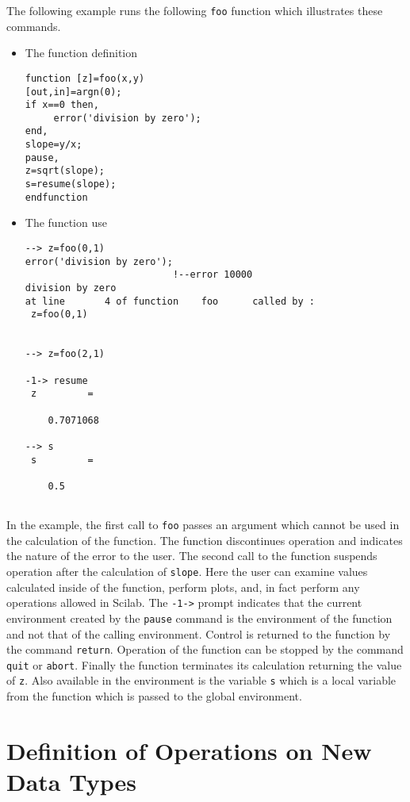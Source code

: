 The following example runs the following {\tt foo} function which
illustrates these commands.
\begin{itemize}
\item The function definition
\begin{verbatim}
function [z]=foo(x,y)
[out,in]=argn(0);
if x==0 then,
     error('division by zero');
end,
slope=y/x;
pause,
z=sqrt(slope);
s=resume(slope);
endfunction
\end{verbatim}
\item The function use
\begin{verbatim} 
--> z=foo(0,1)
error('division by zero');
                          !--error 10000 
division by zero                                                                
at line       4 of function    foo      called by :  
 z=foo(0,1)
 
 
--> z=foo(2,1)
 
-1-> resume
 z         =
 
    0.7071068  
 
--> s
 s         =
 
    0.5  
 
\end{verbatim}
\end{itemize}

In the example, the first call to {\tt foo} passes an argument which cannot
be used in the calculation of the function.  The function discontinues
operation and indicates the nature of the error to the user.  The second call
to the function suspends operation after the calculation of {\tt slope}.
Here the user can examine values calculated inside of the function,
perform plots, and, in fact perform any operations 
allowed in Scilab.  The {\tt -1->} prompt indicates that the current
environment created by the {\tt pause} command is the environment 
of the function and not that of the calling environment.  Control is 
returned to the function by the command {\tt return}.  Operation of the
function can be stopped by the command {\tt quit} or {\tt abort}.
Finally the function terminates its calculation returning the
value of {\tt z}.  Also available in the environment is the variable
{\tt s} which is a local variable from the function which is passed to
the global environment.

\section{Definition of Operations on New Data Types}
\label{s4.3}

